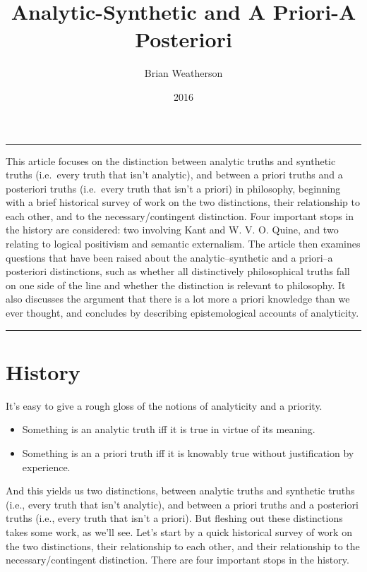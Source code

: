 \documentclass[
  10pt,
  letterpaper,
  DIV=11,
  numbers=noendperiod,
  twoside]{scrartcl}
\title{Analytic-Synthetic and A Priori-A Posteriori}
\author{Brian Weatherson}
\date{2016}
\providecommand{\tightlist}{%
  \setlength{\itemsep}{0pt}\setlength{\parskip}{0pt}}\usepackage{longtable,booktabs,array}
\renewenvironment{abstract}
 {\vspace{-1.25cm}
 \quotation\small\noindent\rule{\linewidth}{.5pt}\par\smallskip
 \noindent }
 {\par\noindent\rule{\linewidth}{.5pt}\endquotation}
\begin{document}
\maketitle
\begin{abstract}
This article focuses on the distinction between analytic truths and
synthetic truths (i.e.~every truth that isn't analytic), and between a
priori truths and a posteriori truths (i.e.~every truth that isn't a
priori) in philosophy, beginning with a brief historical survey of work
on the two distinctions, their relationship to each other, and to the
necessary/contingent distinction. Four important stops in the history
are considered: two involving Kant and W. V. O. Quine, and two relating
to logical positivism and semantic externalism. The article then
examines questions that have been raised about the analytic--synthetic
and a priori--a posteriori distinctions, such as whether all
distinctively philosophical truths fall on one side of the line and
whether the distinction is relevant to philosophy. It also discusses the
argument that there is a lot more a priori knowledge than we ever
thought, and concludes by describing epistemological accounts of
analyticity.
\end{abstract}

\section{History}\label{history}

It's easy to give a rough gloss of the notions of analyticity and a
priority.

\begin{itemize}
\tightlist
\item
  Something is an analytic truth iff it is true in virtue of its
  meaning.
\item
  Something is an a priori truth iff it is knowably true without
  justification by experience.
\end{itemize}

And this yields us two distinctions, between analytic truths and
synthetic truths (i.e., every truth that isn't analytic), and between a
priori truths and a posteriori truths (i.e., every truth that isn't a
priori). But fleshing out these distinctions takes some work, as we'll
see. Let's start by a quick historical survey of work on the two
distinctions, their relationship to each other, and their relationship
to the necessary/contingent distinction. There are four important stops
in the history.
\end{document}
